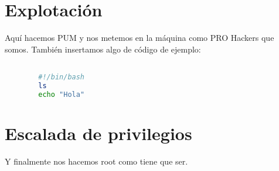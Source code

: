 \documentclass[a4paper]{article} %
\begin{document}
	\section{Explotación}
	Aquí hacemos PUM y nos metemos en la máquina como PRO Hackers que somos. También insertamos algo de código de ejemplo: 
	
	\begin{lstlisting}[language=Bash, caption=Código de ejemplo]

		#!/bin/bash
		ls
		echo "Hola"
	\end{lstlisting}
	
	
	
	\section{Escalada de privilegios}
	Y finalmente nos hacemos root como tiene que ser. 
	
	
	
	
\end{document}
